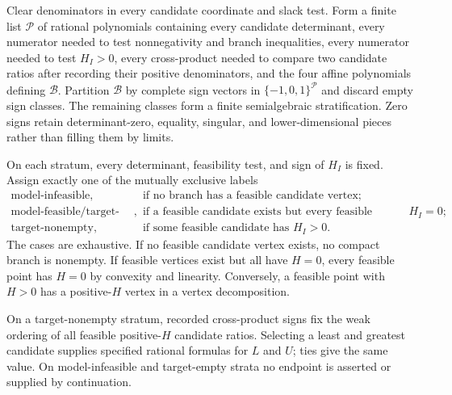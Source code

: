 Clear denominators in every candidate coordinate and slack test. Form a finite list \(\mathscr P\) of rational polynomials containing every candidate determinant, every numerator needed to test nonnegativity and branch inequalities, every numerator needed to test \(H_I>0\), every cross-product needed to compare two candidate ratios after recording their positive denominators, and the four affine polynomials defining \(\mathcal B\). Partition \(\mathcal B\) by complete sign vectors in \(\{-1,0,1\}^{\mathscr P}\) and discard empty sign classes. The remaining classes form a finite semialgebraic stratification. Zero signs retain determinant-zero, equality, singular, and lower-dimensional pieces rather than filling them by limits.

On each stratum, every determinant, feasibility test, and sign of \(H_I\) is fixed. Assign exactly one of the mutually exclusive labels
\[
 \begin{array}{ll}
 \text{model-infeasible},
   &\text{if no branch has a feasible candidate vertex};\\
 \text{model-feasible/target-empty},
   &\text{if a feasible candidate exists but every feasible candidate has }H_I=0;\\
 \text{target-nonempty},
   &\text{if some feasible candidate has }H_I>0.
 \end{array}
\]
The cases are exhaustive. If no feasible candidate vertex exists, no compact branch is nonempty. If feasible vertices exist but all have \(H=0\), every feasible point has \(H=0\) by convexity and linearity. Conversely, a feasible point with \(H>0\) has a positive-\(H\) vertex in a vertex decomposition.

On a target-nonempty stratum, recorded cross-product signs fix the weak ordering of all feasible positive-\(H\) candidate ratios. Selecting a least and greatest candidate supplies specified rational formulas for \(L\) and \(U\); ties give the same value. On model-infeasible and target-empty strata no endpoint is asserted or supplied by continuation.

